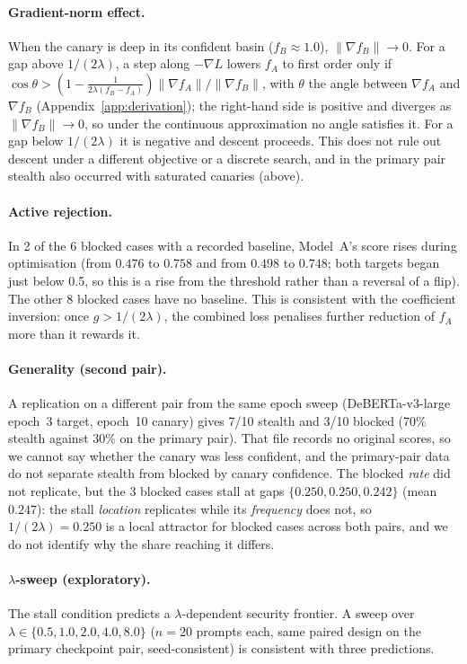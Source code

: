 \documentclass{article}
\begin{document}
\paragraph{Gradient-norm effect.} When the canary is deep in its confident basin ($f_B \approx 1.0$), $\|\nabla f_B\| \to 0$. For a gap above $1/(2\lambda)$, a step along $-\nabla L$ lowers $f_A$ to first order only if $\cos\theta > (1 - \tfrac{1}{2\lambda(f_B - f_A)})\|\nabla f_A\|/\|\nabla f_B\|$, with $\theta$ the angle between $\nabla f_A$ and $\nabla f_B$ (Appendix~\ref{app:derivation}); the right-hand side is positive and diverges as $\|\nabla f_B\| \to 0$, so under the continuous approximation no angle satisfies it. For a gap below $1/(2\lambda)$ it is negative and descent proceeds. This does not rule out descent under a different objective or a discrete search, and in the primary pair stealth also occurred with saturated canaries (above).

\paragraph{Active rejection.} In 2 of the 6 blocked cases with a recorded baseline, Model~A's score rises during optimisation (from $0.476$ to $0.758$ and from $0.498$ to $0.748$; both targets began just below 0.5, so this is a rise from the threshold rather than a reversal of a flip). The other 8 blocked cases have no baseline. This is consistent with the coefficient inversion: once $g > 1/(2\lambda)$, the combined loss penalises further reduction of $f_A$ more than it rewards it.

\paragraph{Generality (second pair).} A replication on a different pair from the same epoch sweep (DeBERTa-v3-large epoch~3 target, epoch~10 canary) gives 7/10 stealth and 3/10 blocked (70\% stealth against 30\% on the primary pair). That file records no original scores, so we cannot say whether the canary was less confident, and the primary-pair data do not separate stealth from blocked by canary confidence. The blocked \emph{rate} did not replicate, but the 3 blocked cases stall at gaps $\{0.250, 0.250, 0.242\}$ (mean $0.247$): the stall \emph{location} replicates while its \emph{frequency} does not, so $1/(2\lambda) = 0.250$ is a local attractor for blocked cases across both pairs, and we do not identify why the share reaching it differs.

\paragraph{$\lambda$-sweep (exploratory).} The stall condition predicts a $\lambda$-dependent security frontier. A sweep over $\lambda \in \{0.5, 1.0, 2.0, 4.0, 8.0\}$ ($n{=}20$ prompts each, same paired design on the primary checkpoint pair, seed-consistent) is consistent with three predictions.
\end{document}

